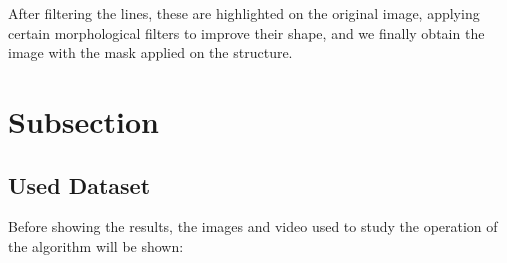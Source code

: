 \documentclass[12pt, a4paper]{article}
\begin{document}
After filtering the lines, these are highlighted on the original image, applying certain morphological filters to improve their shape, and we finally obtain the
image with the mask applied on the structure.

\section{Subsection}



\subsection{Used Dataset}

Before showing the results, the images and video used to study the operation of the algorithm will be shown:
\end{document}
